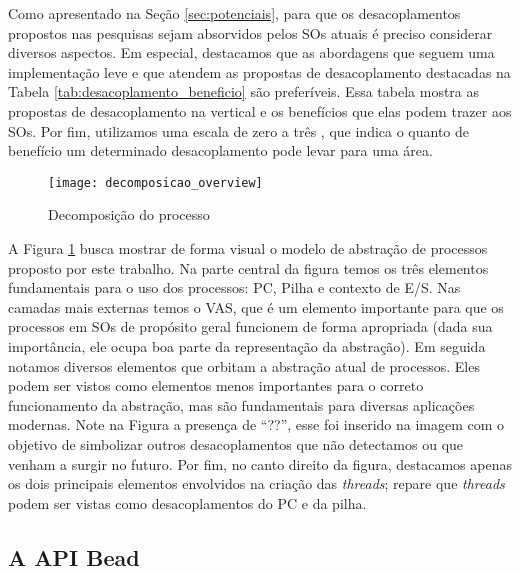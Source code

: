 

Como apresentado na Seção \ref{sec:potenciais}, para que os desacoplamentos
propostos nas pesquisas sejam absorvidos pelos SOs atuais é preciso considerar
diversos aspectos. Em especial, destacamos que as abordagens que seguem uma
implementação leve e que atendem as propostas de desacoplamento destacadas na
Tabela \ref{tab:desacoplamento_beneficio} são preferíveis. Essa tabela mostra as
propostas de desacoplamento na vertical e os benefícios que elas podem trazer
aos SOs. Por fim, utilizamos uma escala de zero a três , que indica o
quanto de benefício um determinado desacoplamento pode levar para uma área.

\begin{figure}[!h]
  \centering
  \texttt{[image: decomposicao\_overview]}
  \caption{Decomposição do processo}
  \label{fig:decomposicao_proc}
\end{figure}

A Figura \ref{fig:decomposicao_proc} busca mostrar de forma visual o modelo de
abstração de processos proposto por este trabalho. Na parte central da figura
temos os três elementos fundamentais para o uso dos processos: PC, Pilha e
contexto de E/S. Nas camadas mais externas temos o VAS, que é um elemento
importante para que os processos em SOs de propósito geral funcionem de forma
apropriada (dada sua importância, ele ocupa boa parte da representação da
abstração).  Em seguida notamos diversos elementos que orbitam a abstração
atual de processos. Eles podem ser vistos como elementos menos importantes para
o correto funcionamento da abstração, mas são fundamentais para diversas
aplicações modernas. Note na Figura a presença de ``??'', esse foi inserido na
imagem com o objetivo de simbolizar outros desacoplamentos que não detectamos
ou que venham a surgir no futuro. Por fim, no canto direito da figura,
destacamos apenas os dois principais elementos envolvidos na criação das
\emph{threads}; repare que \emph{threads} podem ser vistas como desacoplamentos
do PC e da pilha.

\subsection{A API Bead}
\label{sec:api}

